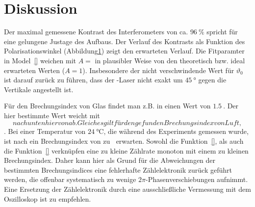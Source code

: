 \section{Diskussion}
Der maximal gemessene Kontrast des Interferometers von ca. $\SI{96}{\percent}$ spricht für 
eine gelungene Justage des Aufbaus. Der Verlauf des Kontrasts als Funktion des Polarisationswinkel 
(Abbildung\ref{}) zeigt den erwarteten Verlauf. Die Fitparamter in Model~\eqref{} weichen mit 
$A = $ in plausibler Weise von den theoretisch bzw. ideal erwarteten Werten ($A = 1$). Insbesondere 
der nicht verschwindende Wert für $\vartheta_0$ ist darauf zurück zu führen, dass der -Laser 
nicht exakt um $\SI{45}{\degree}$ gegen die Vertikale angestellt ist.

Für den Brechungsindex von Glas findet man z.B. in \cite{} einen Wert von $\SI{1.5}{}$. Der hier bestimmte 
Wert weicht mit $$ nach unten hiervon ab. Gleiches gilt 
für den gefunden Brechungsindex von Luft, $$. Bei einer Temperatur von $\SI{24}{\celsius}$, die 
während des Experiments gemessen wurde, ist nach \cite{} ein Brechungsindex von zu $\SI{}{}$ erwarten. Sowohl die 
Funktion~\eqref{}, als auch die Funktion~\eqref{} verknüpfen eine zu kleine Zählrate monoton mit einem zu kleinen 
Brechungsindex. Daher kann hier als Grund für die Abweichungen der bestimmten Brechungsindices eine 
fehlerhafte Zählelektronik zurück geführt werden, die offenbar systematisch zu wenige $2\pi$-Phasenverschiebungen aufnimmt. 
Eine Ersetzung der Zählelektronik durch eine ausschließliche Vermessung mit dem Oszilloskop ist zu empfehlen.
